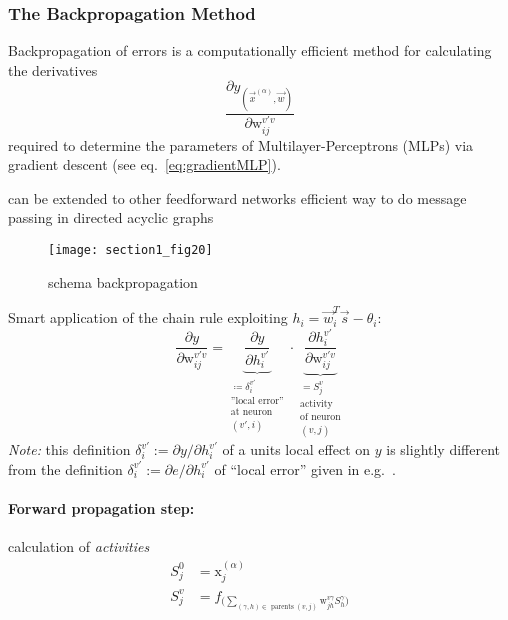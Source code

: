 \subsubsection{The Backpropagation Method}
Backpropagation of errors is a computationally efficient method for calculating the  derivatives
\begin{equation}
	\frac{\partial y_{(\vec{x}^{(\alpha)}, \vec{w})}}{
		\partial \mathrm{w}_{ij}^{v'v}}
\end{equation}
required to determine the parameters of Multilayer-Perceptrons (MLPs) via gradient descent (see eq.~\ref{eq:gradientMLP}).
\begin{itemize}
	\itR can be extended to other feedforward networks
	\itR efficient way to do message passing in directed acyclic graphs
\end{itemize}
\begin{figure}[h]
  \centering
\texttt{[image: section1\_fig20]}   
  \caption{schema backpropagation}
\end{figure}
Smart application of the chain rule exploiting $h_i = \vec{w}_i^T\vec{s}-\theta_i$:
\begin{equation}
	\frac{\partial y}{\partial \mathrm{w}_{ij}^{v'v}}
		= \underbrace{\frac{\partial y}{\partial h_i^{v'}}}_{ 
			\substack{\coloneqq \delta_i^{v'} \\
				\text{''local error''} \\
				\text{at neuron} \\
				(v', i)}}
		  \cdot 
		  \underbrace{\frac{\partial h_i^{v'}}{\partial 
		  	\mathrm{w}_{ij}^{v'v}}}_{
				\substack{= S_j^v \\
				\text{activity} \\
				\text{of neuron} \\
				(v, j)}}
\end{equation}
\emph{Note:} this definition $\delta_i^{v'}:= \partial y/\partial
h_i^{v'}$ of a units local effect on $y$ is slightly different from
the definition $\delta_i^{v'}:= \partial e / \partial h_i^{v'}$ of ``local error'' given in e.g.\ \textcite{Bishop2006}. 


\paragraph{Forward propagation step:}  calculation of \emph{activities}
\begin{align} \tag{initialization: inputs}
	S_j^0 & = \mathrm{x}_j^{(\alpha)} \\
\tag{propagation}
	S_j^v &= f_{\Big( \sum\limits_{(\gamma, h) \in \text{ parents } (v, j)}
			\mathrm{w}_{jh}^{v\gamma} S_h^{\gamma} \Big) }
\end{align}

